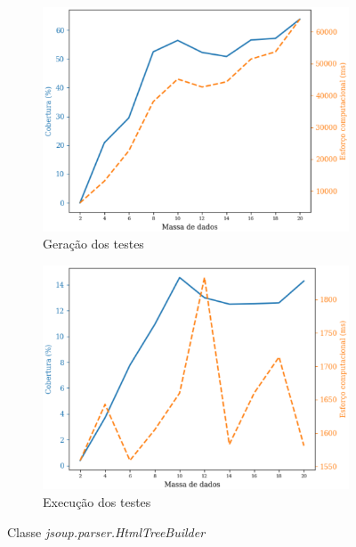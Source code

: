 \begin{figure}[H]
    \centering
    \begin{subfigure}{.5\textwidth}
        \centering
        \includegraphics[scale=0.5]{figuras/jsoup.parser.htmltreebuilder_generation.eps}
        \caption{Geração dos testes}
        \label{fig:genJsoupHtmlTreeBuilder}
    \end{subfigure}%
    \begin{subfigure}{.5\textwidth}
        \centering
        \includegraphics[scale=0.5]{figuras/jsoup.parser.htmltreebuilder_execution.eps}
        \caption{Execução dos testes}
        \label{fig:execJsoupHtmlTreeBuilder}
    \end{subfigure}
    \caption{Classe \textit{jsoup.parser.HtmlTreeBuilder}}
\label{fig:JsoupHtmlTreeBuilder}
\end{figure}

